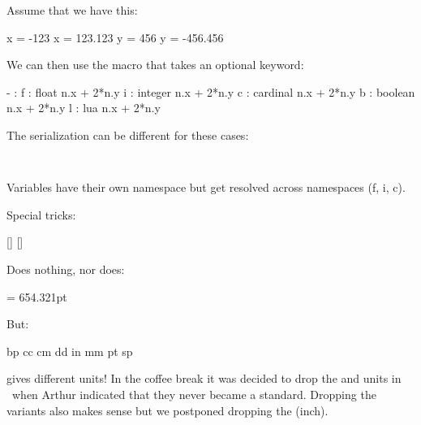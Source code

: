 \page

Assume that we have this:

\startbuffer
\luacardinal x = -123   \luafloat x =  123.123
\luacardinal y =  456   \luafloat y = -456.456
\stopbuffer

\typebuffer \getbuffer

We can then use the macro \type {\luaexpression} that takes an optional keyword:

\startbuffer
- : 
f : \luaexpression float    {n.x + 2*n.y}
i : \luaexpression integer  {n.x + 2*n.y}
c : \luaexpression cardinal {n.x + 2*n.y}
b : \luaexpression boolean  {n.x + 2*n.y}
l : \luaexpression lua      {n.x + 2*n.y}
\stopbuffer

\typebuffer

The serialization can be different for these cases:

\startlines
\tt \getbuffer
\stoplines

Variables have their own namespace but get resolved across namespaces (f, i, c).

\page

Special tricks:

\startbuffer
\scratchdimen 123.456pt [\the\scratchdimen] [\the\nodimen\scratchdimen]
\stopbuffer

\typebuffer \getbuffer

Does nothing, nor does:

\startbuffer
\nodimen\scratchdimen = 654.321pt
\stopbuffer

\typebuffer \getbuffer

But:

\starttabulate[|T|T|]
\NC {} \NC \the\nodimen bp \scratchdimen \NC \NR
\NC {} \NC \the\nodimen cc \scratchdimen \NC \NR
\NC {} \NC \the\nodimen cm \scratchdimen \NC \NR
\NC {} \NC \the\nodimen dd \scratchdimen \NC \NR
\NC {} \NC \the\nodimen in \scratchdimen \NC \NR
\NC {} \NC \the\nodimen mm \scratchdimen \NC \NR
\NC {} \NC \the\nodimen pt \scratchdimen \NC \NR
\NC {} \NC \the\nodimen sp \scratchdimen \NC \NR
\stoptabulate

gives different units! In the coffee break it was decided to drop the 
and  units in \LUAMETATEX\ when Arthur indicated that they never became
a standard. Dropping the  variants also makes sense but we postponed
dropping the  (inch).

